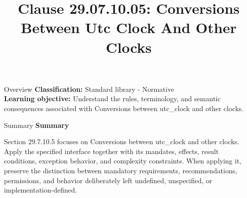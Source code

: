 \documentclass[10pt,letterpaper]{article}
\title{Clause 29.07.10.05: Conversions Between Utc Clock And Other Clocks}
\author{}
\date{}
\begin{document}
\maketitle
\begin{CornellOverviewBox}{Overview}
\textbf{Classification:} Standard library - Normative\\[2pt]
\textbf{Learning objective:} Understand the rules, terminology, and semantic consequences associated with Conversions between utc\_clock and other clocks.
\end{CornellOverviewBox}\begin{CornellSummaryBox}{Summary}
{\sffamily\bfseries\color{Accent} Summary}\par\vspace{3pt}Section 29.7.10.5 focuses on Conversions between utc\_clock and other clocks. Apply the specified interface together with its mandates, effects, result conditions, exception behavior, and complexity constraints. When applying it, preserve the distinction between mandatory requirements, recommendations, permissions, and behavior deliberately left undefined, unspecified, or implementation-defined.
\end{CornellSummaryBox}
\end{document}
